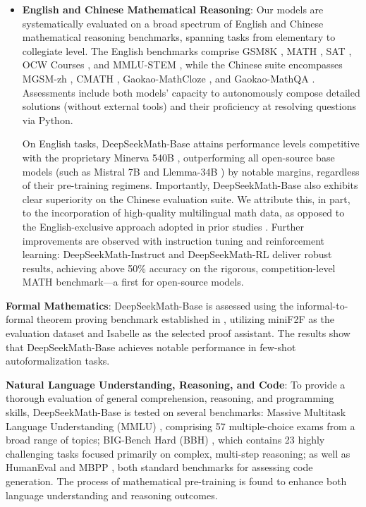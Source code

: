 \begin{itemize}[topsep=0pt]
    \item \textbf{English and Chinese Mathematical Reasoning}: Our models are systematically evaluated on a broad spectrum of English and Chinese mathematical reasoning benchmarks, spanning tasks from elementary to collegiate level. The English benchmarks comprise GSM8K \citep{gsm8k}, MATH \citep{MATH}, SAT \citep{llemma}, OCW Courses \citep{minerva}, and MMLU-STEM \citep{mmlu}, while the Chinese suite encompasses MGSM-zh \citep{mgsm}, CMATH \citep{wei2023cmath}, Gaokao-MathCloze \citep{agieval}, and Gaokao-MathQA \citep{agieval}. Assessments include both models' capacity to autonomously compose detailed solutions (without external tools) and their proficiency at resolving questions via Python.

    On English tasks, DeepSeekMath-Base attains performance levels competitive with the proprietary Minerva 540B \citep{minerva}, outperforming all open-source base models (such as Mistral 7B \citep{mistral} and Llemma-34B \citep{llemma}) by notable margins, regardless of their pre-training regimens. Importantly, DeepSeekMath-Base also exhibits clear superiority on the Chinese evaluation suite. We attribute this, in part, to the incorporation of high-quality multilingual math data, as opposed to the English-exclusive approach adopted in prior studies \citep{minerva,llemma}. Further improvements are observed with instruction tuning and reinforcement learning: DeepSeekMath-Instruct and DeepSeekMath-RL deliver robust results, achieving above 50\% accuracy on the rigorous, competition-level MATH benchmark—a first for open-source models.
\end{itemize}

\item \textbf{Formal Mathematics}: DeepSeekMath-Base is assessed using the informal-to-formal theorem proving benchmark established in \citep{dsp_proof}, utilizing miniF2F \citep{minif2f} as the evaluation dataset and Isabelle \citep{isabelle} as the selected proof assistant. The results show that DeepSeekMath-Base achieves notable performance in few-shot autoformalization tasks.
\item \textbf{Natural Language Understanding, Reasoning, and Code}: To provide a thorough evaluation of general comprehension, reasoning, and programming skills, DeepSeekMath-Base is tested on several benchmarks: Massive Multitask Language Understanding (MMLU) \citep{mmlu}, comprising 57 multiple-choice exams from a broad range of topics; BIG-Bench Hard (BBH) \citep{bbh}, which contains 23 highly challenging tasks focused primarily on complex, multi-step reasoning; as well as HumanEval \citep{codex} and MBPP \citep{mbpp}, both standard benchmarks for assessing code generation. The process of mathematical pre-training is found to enhance both language understanding and reasoning outcomes.

